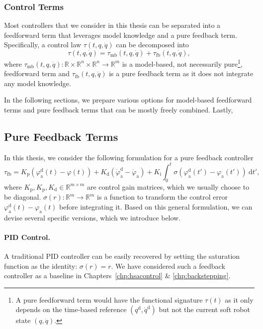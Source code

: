 \subsubsection{Control Terms}
Most controllers that we consider in this thesis can be separated into a feedforward term that leverages model knowledge and a pure feedback term. 
Specifically, a control law $\tau(t, q, \dot{q})$ can be decomposed into
\begin{equation}
    \tau(t, q, \dot{q}) = \tau_\mathrm{mb}(t, q, \dot{q}) + \tau_\mathrm{fb}(t, q, \dot{q}),
\end{equation}
where $\tau_\mathrm{mb}(t, q, \dot{q}): \mathbb{R} \times \mathbb{R}^n \times \mathbb{R}^n \to \mathbb{R}^m$ is a model-based, not necessarily pure\footnote{A pure feedforward term would have the functional signature $\tau(t)$ as it only depends on the time-based reference $(q^\mathrm{d},\dot{q}^\mathrm{d})$ but not the current soft robot state $(q,\dot{q})$.}, feedforward term and $\tau_\mathrm{fb}(t, q, \dot{q})$ is a pure feedback term as it does not integrate any model knowledge.

In the following sections, we prepare various options for model-based feedforward terms and pure feedback terms that can be mostly freely combined. Lastly, 

\subsection{Pure Feedback Terms}\label{sub:background:model_based_control:feedback_terms}
In this thesis, we consider the following formulation for a pure feedback controller
\begin{equation}
    \tau_\mathrm{fb} = K_\mathrm{p} \left (\varphi_\mathrm{a}^\mathrm{d}(t) - \varphi(t) \right ) + K_\mathrm{d} \left ( \dot{\varphi}_\mathrm{a}^\mathrm{d} - \dot{\varphi}_\mathrm{a} \right ) + K_\mathrm{i} \int_0^t \sigma \left ( \varphi_{\mathrm{a}}^\mathrm{d}(t')-\varphi_{\mathrm{a}}(t') \right ) \: \mathrm{d} t',
\end{equation}
where $K_\mathrm{p}, K_\mathrm{p}, K_\mathrm{d} \in \mathbb{R}^{m \times m}$ are control gain matrices, which we usually choose to be diagonal. $\sigma(r): \mathbb{R}^m \to \mathbb{R}^m$ is a function to transform the control error $\varphi_{\mathrm{a}}^\mathrm{d}(t)-\varphi_{\mathrm{a}}(t)$ before integrating it.
Based on this general formulation, we can devise several specific versions, which we introduce below.

\paragraph{PID Control.} A traditional PID controller can be easily recovered by setting the saturation function as the identity: $\sigma(r) = r$. We have considered such a feedback controller as a baseline in Chapters~\ref{chp:hsacontrol} \& \ref{chp:backstepping}.

